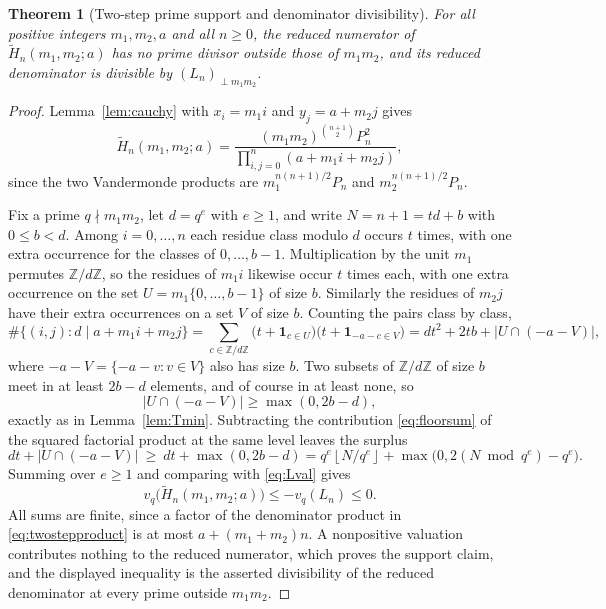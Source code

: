 \documentclass[11pt,a4paper]{article}
\numberwithin{equation}{section}
\newtheorem{theorem}{Theorem}[section]
\theoremstyle{definition}
\theoremstyle{remark}
\newcommand{\Z}{\mathbb{Z}}
\newcommand{\floor}[1]{\left\lfloor#1\right\rfloor}
\newcommand{\abs}[1]{\left|#1\right|}
\begin{document}
\begin{theorem}[Two-step prime support and denominator divisibility]\label{thm:twosteps}
For all positive integers $m_1,m_2,a$ and all $n\geq0$, the reduced numerator of $\widetilde H_n(m_1,m_2;a)$ has no prime divisor outside those of $m_1m_2$, and its reduced denominator is divisible by $(L_n)_{\perp m_1m_2}$.
\end{theorem}
\begin{proof}
Lemma~\ref{lem:cauchy} with $x_i=m_1i$ and $y_j=a+m_2j$ gives
\begin{equation}\label{eq:twostepproduct}
 \widetilde H_n(m_1,m_2;a)
 =\frac{(m_1m_2)^{\binom{n+1}{2}}P_n^2}
 {\displaystyle\prod_{i,j=0}^n(a+m_1i+m_2j)},
\end{equation}
since the two Vandermonde products are $m_1^{n(n+1)/2}P_n$ and $m_2^{n(n+1)/2}P_n$.

Fix a prime $q\nmid m_1m_2$, let $d=q^e$ with $e\geq1$, and write $N=n+1=td+b$ with $0\leq b<d$. Among $i=0,\ldots,n$ each residue class modulo $d$ occurs $t$ times, with one extra occurrence for the classes of $0,\ldots,b-1$. Multiplication by the unit $m_1$ permutes $\Z/d\Z$, so the residues of $m_1i$ likewise occur $t$ times each, with one extra occurrence on the set $U=m_1\{0,\ldots,b-1\}$ of size $b$. Similarly the residues of $m_2j$ have their extra occurrences on a set $V$ of size $b$. Counting the pairs class by class,
\[
 \#\{(i,j):d\mid a+m_1i+m_2j\}
 =\sum_{c\in\Z/d\Z}\bigl(t+\mathbf 1_{c\in U}\bigr)
 \bigl(t+\mathbf 1_{-a-c\in V}\bigr)
 =dt^2+2tb+\abs{U\cap(-a-V)},
\]
where $-a-V=\{-a-v:v\in V\}$ also has size $b$. Two subsets of $\Z/d\Z$ of size $b$ meet in at least $2b-d$ elements, and of course in at least none, so
\[
 \abs{U\cap(-a-V)}\geq\max(0,2b-d),
\]
exactly as in Lemma~\ref{lem:Tmin}. Subtracting the contribution \eqref{eq:floorsum} of the squared factorial product at the same level leaves the surplus
\[
 dt+\abs{U\cap(-a-V)}\ \geq\ dt+\max(0,2b-d)
 =q^e\floor{N/q^e}+\max\bigl(0,2(N\bmod q^e)-q^e\bigr).
\]
Summing over $e\geq1$ and comparing with \eqref{eq:Lval} gives
\[
 v_q\bigl(\widetilde H_n(m_1,m_2;a)\bigr)\leq-v_q(L_n)\leq0 .
\]
All sums are finite, since a factor of the denominator product in \eqref{eq:twostepproduct} is at most $a+(m_1+m_2)n$. A nonpositive valuation contributes nothing to the reduced numerator, which proves the support claim, and the displayed inequality is the asserted divisibility of the reduced denominator at every prime outside $m_1m_2$.
\end{proof}
\end{document}
